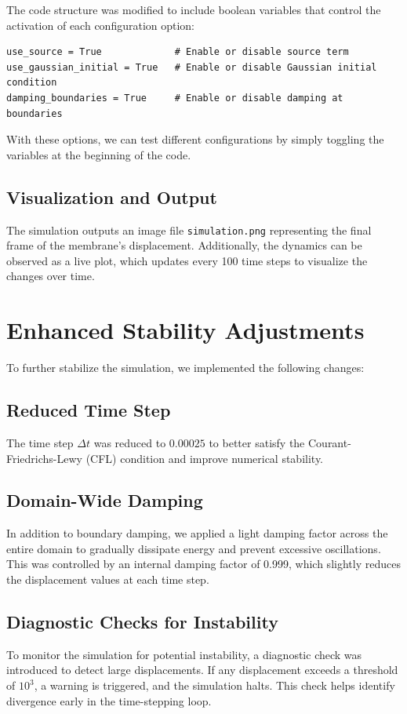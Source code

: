 \documentclass{article}
\begin{document}
The code structure was modified to include boolean variables that control the activation of each configuration option:
\begin{verbatim}
use_source = True             # Enable or disable source term
use_gaussian_initial = True   # Enable or disable Gaussian initial condition
damping_boundaries = True     # Enable or disable damping at boundaries
\end{verbatim}

With these options, we can test different configurations by simply toggling the variables at the beginning of the code.

\subsection{Visualization and Output}

The simulation outputs an image file \texttt{simulation.png} representing the final frame of the membrane’s displacement. Additionally, the dynamics can be observed as a live plot, which updates every 100 time steps to visualize the changes over time.


\section{Enhanced Stability Adjustments}

To further stabilize the simulation, we implemented the following changes:

\subsection{Reduced Time Step}
The time step $\Delta t$ was reduced to $0.00025$ to better satisfy the Courant-Friedrichs-Lewy (CFL) condition and improve numerical stability.

\subsection{Domain-Wide Damping}
In addition to boundary damping, we applied a light damping factor across the entire domain to gradually dissipate energy and prevent excessive oscillations. This was controlled by an internal damping factor of 0.999, which slightly reduces the displacement values at each time step.

\subsection{Diagnostic Checks for Instability}
To monitor the simulation for potential instability, a diagnostic check was introduced to detect large displacements. If any displacement exceeds a threshold of $10^3$, a warning is triggered, and the simulation halts. This check helps identify divergence early in the time-stepping loop.
\end{document}
